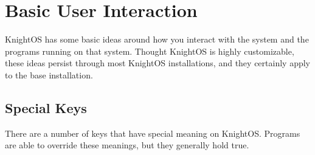 \chapter{Basic User Interaction}

KnightOS has some basic ideas around how you interact with the system and the
programs running on that system. Thought KnightOS is highly customizable, these
ideas persist through most KnightOS installations, and they certainly apply to the
base installation.

\section{Special Keys}

There are a number of keys that have special meaning on KnightOS. Programs are
able to override these meanings, but they generally hold true.

